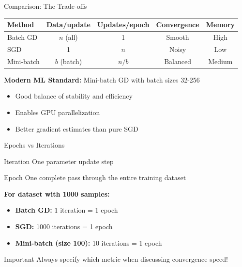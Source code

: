\documentclass[usenames,dvipsnames]{beamer}
\begin{document}
  \begin{frame}{Comparison: The Trade-offs}
    \begin{center}
    \small
    \begin{tabular}{|l|c|c|c|c|}
        \hline
        \textbf{Method} & \textbf{Data/update} & \textbf{Updates/epoch} & \textbf{Convergence} & \textbf{Memory} \\
        \hline
        Batch GD & $n$ (all) & 1 & Smooth & High \\
        \hline
        SGD & 1 & $n$ & Noisy & Low \\
        \hline
        Mini-batch & $b$ (batch) & $n/b$ & Balanced & Medium \\
        \hline
    \end{tabular}
    \end{center}
    
    \pause
    \begin{keypointsbox}
    \textbf{Modern ML Standard:} Mini-batch GD with batch sizes 32-256
    \begin{itemize}
        \item Good balance of stability and efficiency
        \item Enables GPU parallelization  
        \item Better gradient estimates than pure SGD
    \end{itemize}
    \end{keypointsbox}
  \end{frame}

  \begin{frame}{Epochs vs Iterations}
    \begin{definitionbox}{Iteration}
    One parameter update step
    \end{definitionbox}
    
    \begin{definitionbox}{Epoch}
    One complete pass through the entire training dataset
    \end{definitionbox}
    
    \pause
    \textbf{For dataset with 1000 samples:}
    \begin{itemize}[<+->]
        \item \textbf{Batch GD:} 1 iteration = 1 epoch
        \item \textbf{SGD:} 1000 iterations = 1 epoch
        \item \textbf{Mini-batch (size 100):} 10 iterations = 1 epoch
    \end{itemize}
    
    \pause
    \begin{alertbox}{Important}
    Always specify which metric when discussing convergence speed!
    \end{alertbox}
  \end{frame}
\end{document}
